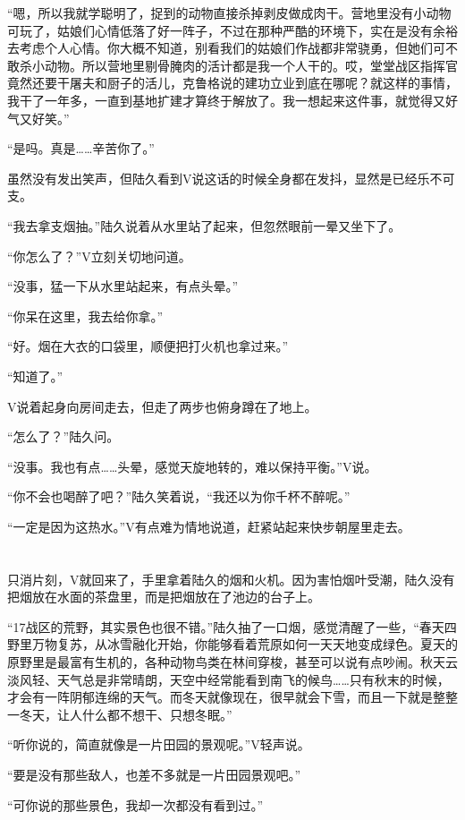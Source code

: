 “嗯，所以我就学聪明了，捉到的动物直接杀掉剥皮做成肉干。营地里没有小动物可玩了，姑娘们心情低落了好一阵子，不过在那种严酷的环境下，实在是没有余裕去考虑个人心情。你大概不知道，别看我们的姑娘们作战都非常骁勇，但她们可不敢杀小动物。所以营地里剔骨腌肉的活计都是我一个人干的。哎，堂堂战区指挥官竟然还要干屠夫和厨子的活儿，克鲁格说的建功立业到底在哪呢？就这样的事情，我干了一年多，一直到基地扩建才算终于解放了。我一想起来这件事，就觉得又好气又好笑。”

“是吗。真是……辛苦你了。”

虽然没有发出笑声，但陆久看到V说这话的时候全身都在发抖，显然是已经乐不可支。

“我去拿支烟抽。”陆久说着从水里站了起来，但忽然眼前一晕又坐下了。

“你怎么了？”V立刻关切地问道。

“没事，猛一下从水里站起来，有点头晕。”

“你呆在这里，我去给你拿。”

“好。烟在大衣的口袋里，顺便把打火机也拿过来。”

“知道了。”

V说着起身向房间走去，但走了两步也俯身蹲在了地上。

“怎么了？”陆久问。

“没事。我也有点……头晕，感觉天旋地转的，难以保持平衡。”V说。

“你不会也喝醉了吧？”陆久笑着说，“我还以为你千杯不醉呢。”

“一定是因为这热水。”V有点难为情地说道，赶紧站起来快步朝屋里走去。

\section*{}

只消片刻，V就回来了，手里拿着陆久的烟和火机。因为害怕烟叶受潮，陆久没有把烟放在水面的茶盘里，而是把烟放在了池边的台子上。

“17战区的荒野，其实景色也很不错。”陆久抽了一口烟，感觉清醒了一些，“春天四野里万物复苏，从冰雪融化开始，你能够看着荒原如何一天天地变成绿色。夏天的原野里是最富有生机的，各种动物鸟类在林间穿梭，甚至可以说有点吵闹。秋天云淡风轻、天气总是非常晴朗，天空中经常能看到南飞的候鸟……只有秋末的时候，才会有一阵阴郁连绵的天气。而冬天就像现在，很早就会下雪，而且一下就是整整一冬天，让人什么都不想干、只想冬眠。”

“听你说的，简直就像是一片田园的景观呢。”V轻声说。

“要是没有那些敌人，也差不多就是一片田园景观吧。”

“可你说的那些景色，我却一次都没有看到过。”

